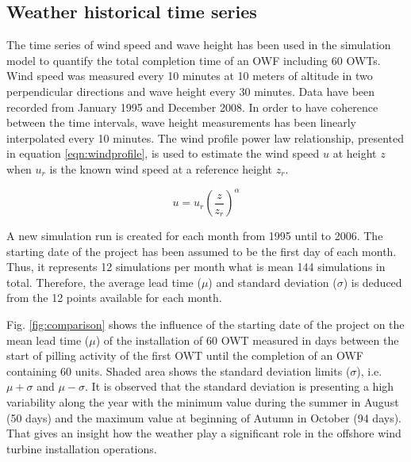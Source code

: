 \subsection{Weather historical time series}
The time series of wind speed and wave height has been used in the simulation model to quantify the total completion time of an OWF including 60 OWTs. Wind speed was measured every 10 minutes at 10 meters of altitude in two perpendicular directions and wave height every 30 minutes. Data have been recorded from January 1995 and December 2008. In order to have coherence between the time intervals, wave height measurements has been linearly interpolated every 10 minutes. The wind profile power law relationship, presented in equation \ref{eqn:windprofile}, is used to estimate the wind speed $u$ at height $z$ when $u_{r}$ is the known wind speed at a reference height $z_{r}$.

\begin{equation}
\label{eqn:windprofile}
u = u_{r} \left( \frac{z}{z_r} \right)^{\alpha}
\end{equation}


A new simulation run is created for each month from 1995 until to 2006. The starting date of the project has been assumed to be the first day of each month. Thus, it represents 12 simulations per month what is mean 144 simulations in total. Therefore, the average lead time ($\mu$) and standard deviation ($\sigma$) is deduced from the 12 points available for each month.

Fig. \ref{fig:comparison} shows the influence of the starting date of the project on the mean lead time ($\mu$) of the installation of 60 OWT measured in days between the start of pilling activity of the first OWT until the completion of an OWF containing 60 units. Shaded area shows the standard deviation limits ($\sigma$), i.e. $\mu + \sigma$ and $\mu - \sigma$. It is observed that the standard deviation is presenting a high variability along the year with the minimum value during the summer in August (50 days) and the maximum value at beginning of Autumn in October (94 days). That gives an insight how the weather play a significant role in the offshore wind turbine installation operations.